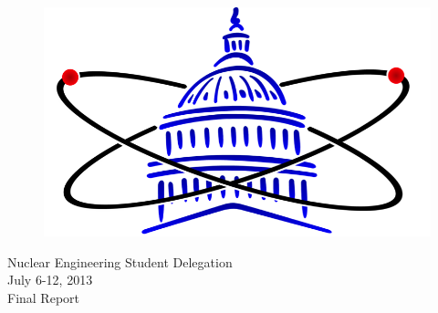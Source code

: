 

\begin{center}
\begin{figure}[hbtp]
\centering
\includegraphics*[scale=1]{NESD_Logo.png}
\end{figure}
\begin{LARGE}
Nuclear Engineering Student Delegation\\
July 6-12, 2013\\
Final Report

\vspace{.5cm}
\end{LARGE}
\end{center}
